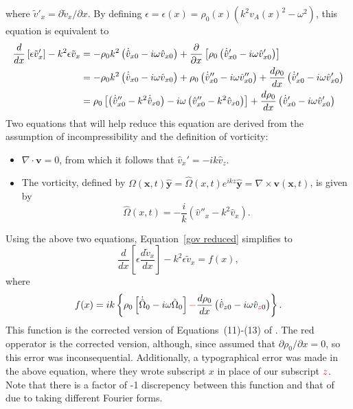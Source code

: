 \documentclass[12pt, draft]{../style-files/ociamthesis}
\begin{document}
where $\tilde{v}'_x = \partial\tilde{v}_x/\partial x$. By defining $\epsilon = \epsilon(x) = \rho_0(x)(k^2v_A(x)^2 - \omega^2)$, this equation is equivalent to
\begin{align}
\frac{d}{dx} \left[\epsilon \tilde{v}_x'\right] - k^2\epsilon \tilde{v}_x & = - \rho_0 k^2\left(\dot{\hat{v}}_{x0} - i\omega\hat{v}_{x0}\right) + \frac{\partial}{\partial x}\left[\rho_0\left(\dot{\hat{v}}_{x0}' - i\omega\hat{v}_{x0}'\right)\right] \notag \\
& = - \rho_0 k^2\left(\dot{\hat{v}}_{x0} - i\omega\hat{v}_{x0}\right) + \rho_0\left(\dot{\hat{v}}_{x0}'' - i\omega\hat{v}_{x0}''\right) + \frac{d\rho_0}{dx}\left(\dot{\hat{v}}_{x0}' - i\omega\hat{v}_{x0}'\right) \notag \\
& = \rho_0\left[\left(\dot{\hat{v}}_{x0}'' - k^2\dot{\hat{v}}_{x0}\right) - i\omega\left(\hat{v}_{x0}'' - k^2\hat{v}_{x0}\right)\right] + \frac{d\rho_0}{dx}\left(\dot{\hat{v}}_{x0}' - i\omega\hat{v}_{x0}'\right)
\label{gov reduced}
\end{align}
Two equations that will help reduce this equation are derived from the assumption of incompressibility and the definition of vorticity:
\begin{itemize}
	\item $\nabla\cdot\mathbf{v} = 0$, from which it follows that $\hat{v}_x' = -ik \hat{v}_z$.
	\item The vorticity, defined by $\Omega(\mathbf{x},t)\mathbf{\hat{y}} = \hat{\Omega}(x,t)e^{ikz}\mathbf{\hat{y}} = \nabla \times \mathbf{v}(\mathbf{x},t)$, is given by	\begin{equation}
	\hat{\Omega}(x,t) = -\frac{i}{k}\left(\hat{v}''_x - k^2 \hat{v}_x\right).
	\end{equation}
\end{itemize}
Using the above two equations, Equation~\eqref{gov reduced} simplifies to
\begin{equation}
\frac{d}{dx} \left[\epsilon \frac{d \tilde{v}_x}{d x}\right] - k^2\epsilon \tilde{v}_x = f(x), \label{gov}
\end{equation}
where
\begin{equation}f(x) = ik\left\{\rho_0\left[\dot{\hat{\Omega}}_0 - i\omega\hat{\Omega}_0\right] \textcolor{red}{-} \frac{d\rho_0}{dx}\left(\dot{\hat{v}}_{z0} - i\omega\hat{v}_{\textcolor{red}{z}0}\right)\right\}.
\end{equation}
This function is the corrected version of Equations~(11)-(13) of \cite{rae_etal81}. The red opperator is the corrected version, although, since \cite{rae_etal81} assumed that $\partial \rho_0 / \partial x = 0$, so this error was inconsequential. Additionally, a typographical error was made in the above equation, where they wrote subscript $x$ in place of our subscript $\textcolor{red}{z}$. Note that there is a factor of -1 discrepency between this function and that of \cite{rae_etal81} due to taking different Fourier forms.
\end{document}

